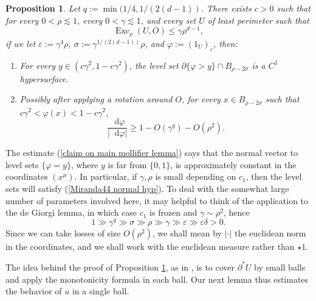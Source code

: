 \documentclass[final,12pt, leqno]{brownthesis}
\DeclareMathOperator{\Exc}{Exc}
\newcommand*\dif{\mathop{}\!\mathrm{d}}
\newtheorem{proposition}[theorem]{Proposition}
\theoremstyle{definition}
\numberwithin{equation}{section}
\begin{document}
\begin{proposition}\label{main mollifier lemma}
Let $q := \min(1/4, 1/(2(d - 1))$.
There exists $c > 0$ such that for every $0 < \rho \lesssim 1$, every $0 < \gamma \lesssim 1$, and every set $U$ of least perimeter such that
\begin{equation}\label{hypothesis on main mollifier lemma}
\Exc_\rho(U, O) \leq \gamma \rho^{d - 1},
\end{equation}
if we let $\varepsilon := \gamma^4\rho$, $\sigma := \gamma^{1/(2(d - 1))}\rho$, and $\varphi := (1_U)_\varepsilon$, then:
\begin{enumerate}
\item For every $y \in (c\gamma^2, 1 - c\gamma^2)$, the level set $\partial \{\varphi > y\} \cap B_{\rho - 2\sigma}$ is a $C^1$ hypersurface.
\item Possibly after applying a rotation around $O$, for every $x \in B_{\rho - 2\sigma}$ such that $c\gamma^2 < \varphi(x) < 1 - c\gamma^2$,
\begin{equation}\label{claim on main mollifier lemma}
\frac{\dif \varphi}{|\dif \varphi|} \geq 1 - O(\gamma^q) - O(\rho^2).
\end{equation}
\end{enumerate}
\end{proposition}

The estimate (\ref{claim on main mollifier lemma}) says that the normal vector to level sets $\{\varphi = y\}$, where $y$ is far from $\{0, 1\}$, is approximately constant in the coordinates $(x^\mu)$.
In particular, if $\gamma, \rho$ is small depending on $c_1$, then the level sets will satisfy (\ref{Miranda44 normal hyp}).
To deal with the somewhat large number of parameters involved here, it may helpful to think of the application to the de Giorgi lemma, in which case $c_1$ is frozen and $\gamma \sim \rho^2$, hence
$$1 \gg \gamma^q \gg \sigma \gg \rho \gg \gamma \gg \varepsilon \gg \varepsilon \delta > 0.$$
Since we can take losses of size $O(\rho^2)$, we shall mean by $|\cdot|$ the euclidean norm in the coordinates, and we shall work with the euclidean measure rather than $\star 1$.

The idea behind the proof of Proposition \ref{main mollifier lemma}, as in \cite{Giusti77}, is to cover $\partial^* U$ by small balls and apply the monotonicity formula in each ball.
Our next lemma thus estimates the behavior of $u$ in a single ball.
\end{document}
